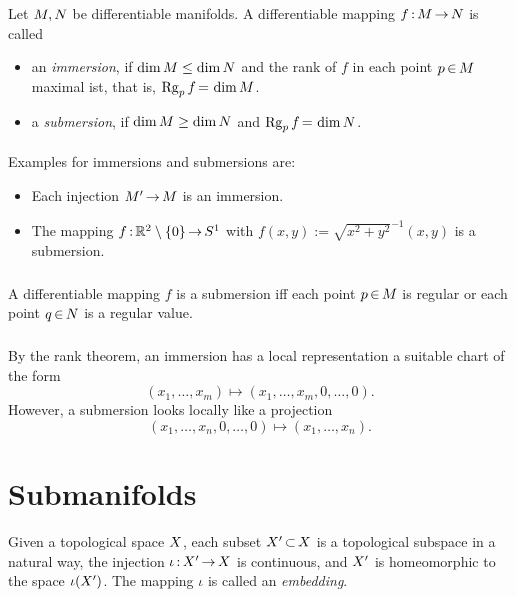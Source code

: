\documentclass[11pt,twoside]{article}
\begin{document}
\begin{definition}
Let ${M},{N}$ be differentiable manifolds.
A differentiable mapping $f {\,:\,} {M} {\,\to\,} {N}$ is called

\begin{itemize}[leftmargin=15pt]
\item[1.]
an \textit{immersion},
if $\operatorname{dim} {M} \leq \operatorname{dim} {N}$
and the rank of $f$ in each point $p {\,\in\,} {M}$ maximal ist,
that is,
$\operatorname{Rg}_p f {\,=\,} \operatorname{dim} {M}$.

\item[2.]
a \textit{submersion},
if $\operatorname{dim} {M} \geq \operatorname{dim} {N}$ and
$\operatorname{Rg}_p f {\,=\,} \operatorname{dim} {N}$.
\end{itemize}
\end{definition}

\paragraph{}
Examples for immersions and submersions are:

\begin{itemize}[leftmargin=15pt]
\item[1.]
Each injection ${M}' {\,\to\,} {M}$ is an immersion.

\item[2.]
The mapping $f{\,:\,} {\mathbb{R}}^2 \setminus \{0\} {\,\to\,} S^1$ with
$f(x,y) := \sqrt{x^2+y^2}^{-1} (x,y)$ is a submersion.
\end{itemize}

\subparagraph{}
A differentiable mapping $f$ is a submersion
iff
each point $p {\,\in\,} {M}$ is regular
or each point $q {\,\in\,} {N}$ is a regular value.

\subparagraph{}
By the rank theorem,
an immersion has a local representation 
{\wrt} a suitable chart of the form
\[
(x_1,\ldots,x_m) \mapsto (x_1,\ldots,x_m,0,\ldots,0).
\]
However,
a submersion looks locally like a projection
\[
(x_1,\ldots,x_n,0,\ldots,0) \mapsto (x_1,\ldots,x_n).
\]

\section{Submanifolds}
Given a topological space $X$,
each subset $X' {\,\subset\,} X$ is a topological subspace in a natural way,
the injection $\iota {\,:\,} X' {\,\to\,} X$ is continuous,
and $X'$ is homeomorphic to the space $\iota(X')$.
The mapping $\iota$ is called an \textit{embedding}.
\end{document}
